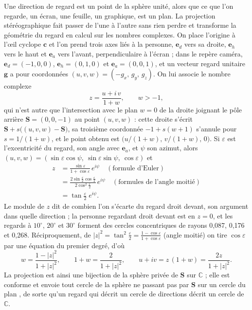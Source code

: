 \documentclass[10pt,a4paper]{article}
\newcommand{\C}{\mathbb{C}}
\newcommand{\vect}[1]{\symbf{#1}}
\begin{document}
Une direction de regard est un point de la sphère unité, alors que ce que l'on regarde, un écran, une feuille, un graphique, est un plan. La projection stéréographique fait passer de l'une à l'autre sans rien perdre et transforme la géométrie du regard en calcul sur les nombres complexes. On place l'origine à l'œil cyclope $\vect c$ et l'on prend trois axes liés à la personne, $\vect e_d$ vers sa droite, $\vect e_h$ vers le haut et $\vect e_a$ vers l'avant, perpendiculaire à l'écran ; dans le repère caméra, $\vect e_d=(-1,0,0)$, $\vect e_h=(0,1,0)$ et $\vect e_a=(0,0,1)$, et un vecteur regard unitaire $\vect g$ a pour coordonnées $(u,v,w)=(-g_x,\,g_y,\,g_z)$. On lui associe le nombre complexe
\begin{equation}\label{eq:stereo}
z=\frac{u+i\,v}{1+w},\qquad w>-1,
\end{equation}
qui n'est autre que l'intersection avec le plan $w=0$ de la droite joignant le pôle arrière $\vect S=(0,0,-1)$ au point $(u,v,w)$ : cette droite s'écrit $\vect S+s\bigl((u,v,w)-\vect S\bigr)$, sa troisième coordonnée $-1+s(w+1)$ s'annule pour $s=1/(1+w)$, et le point obtenu est $\bigl(u/(1+w),\,v/(1+w),\,0\bigr)$. Si $\varepsilon$ est l'excentricité du regard, son angle avec $\vect e_a$, et $\psi$ son azimut, alors $(u,v,w)=(\sin\varepsilon\cos\psi,\ \sin\varepsilon\sin\psi,\ \cos\varepsilon)$ et
\begin{align}
z&=\frac{\sin\varepsilon}{1+\cos\varepsilon}\,e^{i\psi}\quad(\text{formule d'Euler})\\
&=\frac{2\sin\frac\varepsilon2\cos\frac\varepsilon2}{2\cos^2\frac\varepsilon2}\,e^{i\psi}\quad(\text{formules de l'angle moitié})\\
&=\tan\frac{\varepsilon}{2}\;e^{i\psi}.
\end{align}
Le module de $z$ dit de combien l'on s'écarte du regard droit devant, son argument dans quelle direction ; la personne regardant droit devant est en $z=0$, et les regards à $10^\circ$, $20^\circ$ et $30^\circ$ forment des cercles concentriques de rayons 0,087, 0,176 et 0,268. Réciproquement, de $|z|^2=\tan^2\frac\varepsilon2=\frac{1-\cos\varepsilon}{1+\cos\varepsilon}$ (angle moitié) on tire $\cos\varepsilon$ par une équation du premier degré, d'où
\begin{equation}
w=\frac{1-|z|^2}{1+|z|^2},\qquad 1+w=\frac{2}{1+|z|^2},\qquad u+iv=z\,(1+w)=\frac{2z}{1+|z|^2}.
\end{equation}
La projection est ainsi une bijection de la sphère privée de $\vect S$ sur $\C$ ; elle est conforme et envoie tout cercle de la sphère ne passant pas par $\vect S$ sur un cercle du plan \cite{needham1997}, de sorte qu'un regard qui décrit un cercle de directions décrit un cercle de $\C$.
\end{document}
